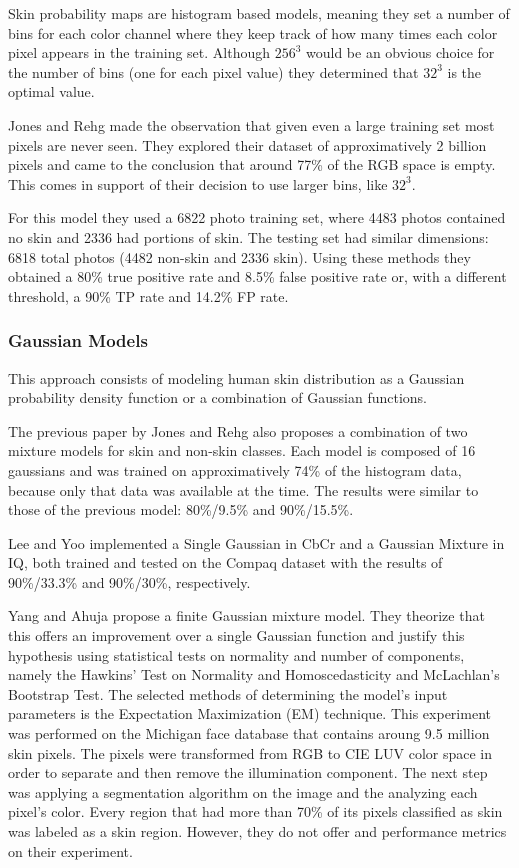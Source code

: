 \documentclass[12pt]{report}
\begin{document}
	Skin probability maps are histogram based models, meaning they set a number of bins for each color channel where they keep track of how many times each color pixel appears in the training set. Although \(256^3\) would be an obvious choice for the number of bins (one for each pixel value) they determined that \(32^3\) is the optimal value.
	
	Jones and Rehg\cite{compaq} made the observation that given even a large training set most pixels are never seen. They explored their dataset of approximatively 2 billion pixels and came to the conclusion that around 77\% of the RGB space is empty. This comes in support of their decision to use larger bins, like \(32^3\).
	
	For this model they used a 6822 photo training set, where 4483 photos contained no skin and 2336 had portions of skin. The testing set had similar dimensions: 6818 total photos (4482 non-skin and 2336 skin). Using these methods they obtained a 80\% true positive rate and 8.5\% false positive rate or, with a different threshold, a 90\% TP rate and 14.2\% FP rate.
	
	\subsubsection{Gaussian Models}
	This approach consists of modeling human skin distribution as a Gaussian probability density function or a combination of Gaussian functions.
	
	The previous paper\cite{compaq} by Jones and Rehg also proposes a combination of two mixture models for skin and non-skin classes. Each model is composed of 16 gaussians and was trained on approximatively 74\% of the histogram data, because only that data was available at the time. The results were similar to those of the previous model: 80\%/9.5\% and 90\%/15.5\%.
	
	Lee and Yoo\cite{gaussian_applied} implemented a Single Gaussian in CbCr and a Gaussian Mixture in IQ, both trained and tested on the Compaq dataset with the results of 90\%/33.3\% and 90\%/30\%, respectively.
	
	Yang and Ahuja\cite{Yang99gaussianmixture} propose a finite Gaussian mixture model. They theorize that this offers an improvement over a single Gaussian function and justify this hypothesis using statistical tests on normality and number of components, namely the Hawkins' Test on Normality and Homoscedasticity and McLachlan's Bootstrap Test. The selected methods of determining the model's input parameters is the Expectation Maximization (EM) technique. This experiment was performed on the Michigan face database that contains aroung 9.5 million skin pixels. The pixels were transformed from RGB to CIE LUV color space in order to separate and then remove the illumination component. The next step was applying a segmentation algorithm on the image and the analyzing each pixel's color. Every region that had more than 70\% of its pixels classified as skin was labeled as a skin region. However, they do not offer and performance metrics on their experiment.
	
\end{document}
